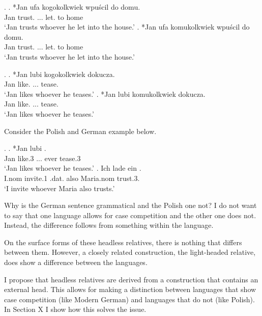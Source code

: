\ex.
\ag. *Jan ufa kogokolkwiek wpuścil do domu.\\
Jan trust. ... let. to home\\
`Jan trusts whoever he let into the house.'
\bg. *Jan ufa komukolkwiek wpuścil do domu.\\
Jan trust. ... let. to home\\
`Jan trusts whoever he let into the house.'

\ex.
\ag. *Jan lubi kogokolkwiek dokucza.\\
Jan like. ... tease.\\
`Jan likes whoever he teases.'
\bg. *Jan lubi komukolkwiek dokucza.\\
Jan like. ... tease.\\
`Jan likes whoever he teases.'

Consider the Polish and German example below.

\ex.
\ag. *Jan lubi   .\\
Jan like.3\scsub{[acc]} ... ever tease.3\scsub{[dat]}\\
`Jan likes whoever he teases.'\label{ex:polish-acc-dat}
\bg. Ich {lade ein}    . \\
 I.\ac{nom} invite.1\scsub{[acc]} .\ac{dat}. also Maria.\ac{nom} trust.3\scsub{[dat]}.\\
 `I invite whoever Maria also trusts.' \label{ex:mg-acc-dat-disallow}

Why is the German sentence grammatical and the Polish one not? I do not want to say that one language allows for case competition and the other one does not. Instead, the difference follows from something within the language.

On the surface forms of these headless relatives, there is nothing that differs between them. However, a closely related construction, the light-headed relative, does show a difference between the languages.

I propose that headless relatives are derived from a construction that contains an external head. This allows for making a distinction between languages that show case competition (like Modern German) and languages that do not (like Polish). In Section X I show how this solves the issue.



